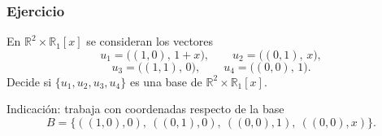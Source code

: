 \begin{frame}
    \frametitle{Ejercicio}

    \begin{exercise}
        En $\mathbb{R}^2\times\mathbb{R}_1[x]$ se consideran los vectores
        \[
            u_1=\bigl((1,0),\,1+x\bigr),
            \qquad
            u_2=\bigl((0,1),\,x\bigr),
        \]
        \[
            u_3=\bigl((1,1),\,0\bigr),
            \qquad
            u_4=\bigl((0,0),\,1\bigr).
        \]
        Decide si $\{u_1,u_2,u_3,u_4\}$ es una base de
        $\mathbb{R}^2\times\mathbb{R}_1[x]$.
    \end{exercise}

    \medskip

    \alert{Indicación:} trabaja con coordenadas respecto de la base
    \[
        B=\bigl\{((1,0),0),\ ((0,1),0),\ ((0,0),1),\ ((0,0),x)\bigr\}.
    \]
\end{frame}


